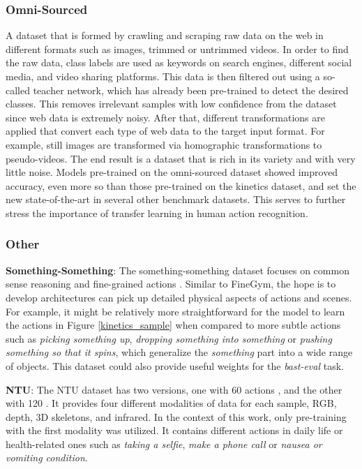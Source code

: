 \documentclass[extern,palatino]{cgMA}
\begin{document}
\subsubsection{Omni-Sourced}
\label{omni-sourced}
A dataset that is formed by crawling and scraping raw data on the web in different formats such as images, trimmed or untrimmed videos\cite{duan2020omni}. In order to find the raw data, class labels are used as keywords on search engines, different social media, and video sharing platforms. This data is then filtered out using a so-called teacher network, which has already been pre-trained to detect the desired classes. This removes irrelevant samples with low confidence from the dataset since web data is extremely noisy. After that, different transformations are applied that convert each type of web data to the target input format. For example, still images are transformed via homographic transformations to pseudo-videos. The end result is a dataset that is rich in its variety and with very little noise. Models pre-trained on the omni-sourced dataset showed improved accuracy, even more so than those pre-trained on the kinetics dataset, and set the new state-of-the-art in several other benchmark datasets. This serves to further stress the importance of transfer learning in human action recognition.

\subsubsection{Other}
\label{other}

\noindent\textbf{Something-Something}: The something-something dataset focuses on common sense reasoning and fine-grained actions \cite{Goyal_2017_ICCV}. Similar to FineGym, the hope is to develop architectures can pick up detailed physical aspects of actions and scenes. For example, it might be relatively more straightforward for the model to learn the actions in Figure \ref{kinetics_sample} when compared to more subtle actions such as \textit{picking something up}, \textit{dropping something into something} or \textit{pushing something so that it spins}, which generalize the \textit{something} part into a wide range of objects. This dataset could also provide useful weights for the \textit{bast-eval} task.

\bigskip
\noindent\textbf{NTU}: The NTU dataset has two versions, one with 60 actions \cite{shahroudy2016ntu}, and the other with 120 \cite{liu2019ntu}. It provides four different modalities of data for each sample, RGB, depth, 3D skeletons, and infrared. In the context of this work, only pre-training with the first modality was utilized. It contains different actions in daily life or health-related ones such as \textit{taking a selfie}, \textit{make a phone call} or \textit{nausea or vomiting condition}.
\end{document}
